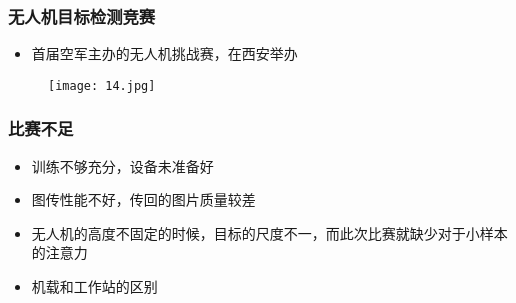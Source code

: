 \begin{frame}
    \frametitle{无人机目标检测竞赛}
    \begin{itemize}
        \item 首届空军主办的无人机挑战赛，在西安举办
    \end{itemize} 
    \begin{figure}
        \texttt{[image: 14.jpg]} 
    \end{figure}          
\end{frame}

\begin{frame}
    \frametitle{比赛不足}
    \begin{itemize}
        \item 训练不够充分，设备未准备好
        \item 图传性能不好，传回的图片质量较差
        \item 无人机的高度不固定的时候，目标的尺度不一，而此次比赛就缺少对于小样本的注意力
        \item 机载和工作站的区别
    \end{itemize}
\end{frame}
